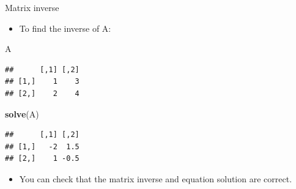 \documentclass[ignorenonframetext,]{beamer}
\newenvironment{Shaded}{\begin{snugshade}}{\end{snugshade}}
\newcommand{\KeywordTok}[1]{\textcolor[rgb]{0.13,0.29,0.53}{\textbf{#1}}}
\newcommand{\NormalTok}[1]{#1}
\providecommand{\tightlist}{%
  \setlength{\itemsep}{0pt}\setlength{\parskip}{0pt}}
\begin{document}
\begin{frame}[fragile]{Matrix inverse}
\protect\hypertarget{matrix-inverse}{}

\begin{itemize}
\tightlist
\item
  To find the inverse of A:
\end{itemize}

\begin{Shaded}
\begin{Highlighting}[]
\NormalTok{A}
\end{Highlighting}
\end{Shaded}

\begin{verbatim}
##      [,1] [,2]
## [1,]    1    3
## [2,]    2    4
\end{verbatim}

\begin{Shaded}
\begin{Highlighting}[]
\KeywordTok{solve}\NormalTok{(A)}
\end{Highlighting}
\end{Shaded}

\begin{verbatim}
##      [,1] [,2]
## [1,]   -2  1.5
## [2,]    1 -0.5
\end{verbatim}

\begin{itemize}
\tightlist
\item
  You can check that the matrix inverse and equation solution are
  correct.
\end{itemize}

\end{frame}
\end{document}
